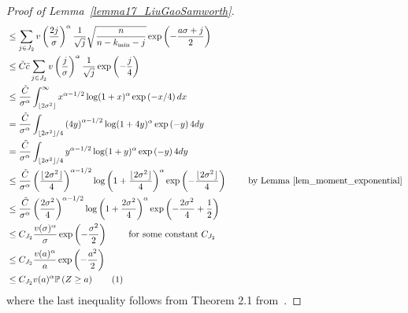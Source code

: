 \documentclass{article}
\newcommand\numberthis{\addtocounter{equation}{1}\tag{\theequation}}
\begin{document}
\begin{proof}[Proof of Lemma~\ref{lemma17_LiuGaoSamworth}]
\begin{align*}
    & \leq  \sum_{j\in J_2} v\left(\frac{2j}{\sigma}\right)^\alpha \frac{1}{\sqrt{j}} \sqrt{\frac{n}{n-k_{\min} - j}} \exp\left(-  \frac{a\sigma + j}{2} \right) \\%
    & \leq \tilde C \bar c\sum_{j\in J_2}v\left(\frac{j}{\sigma}\right)^\alpha \frac{1}{\sqrt{j}} \exp\left(- \frac{j}{4}\right)\\
    & \leq \frac{\tilde C}{\sigma^\alpha}\int_{\lfloor 2 \sigma^2\rfloor}^\infty x^{\alpha - 1/2} \log(1+x)^\alpha \exp\left(-x/4\right) dx\\
    & = \frac{ \tilde C}{\sigma^\alpha} \int_{\lfloor 2 \sigma^2\rfloor/4} \left(4y\right)^{\alpha-1/2}  \log(1+4y)^\alpha\exp\left(-y\right) 4 dy\\
    & = \frac{ \tilde C}{\sigma^\alpha} \int_{\lfloor 2 \sigma^2\rfloor/4} y^{\alpha-1/2}  \log(1+y)^\alpha\exp\left(-y\right) 4 dy\\
    & \leq \frac{\tilde C}{\sigma^\alpha} \left(\frac{\lfloor 2 \sigma^2\rfloor}{4}\right)^{\alpha - 1/2} \log\left(1+\frac{\lfloor2\sigma^2\rfloor}{4}\right)^\alpha \exp\left( - \frac{\lfloor 2 \sigma^2\rfloor}{4}\right) \qquad \text{ by Lemma~\ref{lem_moment_exponential}}\\
    &\leq \frac{\tilde C}{\sigma^\alpha} \left(\frac{ 2 \sigma^2}{4}\right)^{\alpha - 1/2} \log\left(1+\frac{2\sigma^2}{4}\right)^\alpha \exp\left( - \frac{2 \sigma^2}{4} + \frac{1}{2}\right)\\
    & \leq C_{J_2}\frac{v(\sigma)^\alpha}{\sigma} \exp\left(-\frac{\sigma^2}{2}\right) \qquad \text{ for some constant } C_{J_2}\\
    & \leq C_{J_2} \frac{v(a)^\alpha}{a} \exp\left(-\frac{a^2}{2}\right) \\
    & \leq C_{J_2} v(a)^\alpha \mathbb P\left(Z \geq a\right)\numberthis\label{eq_term_II_J2}
\end{align*}
where the last inequality follows from Theorem 2.1 from~\cite{slud1977distribution}.


\end{proof}
\end{document}
